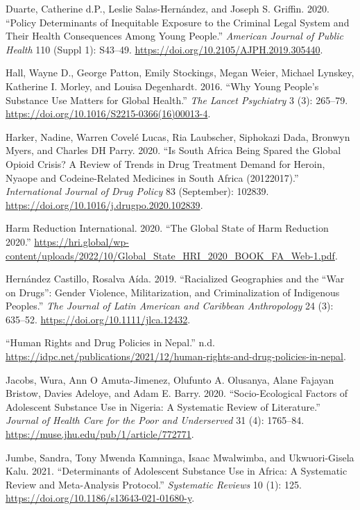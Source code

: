 \documentclass[
  letterpaper,
  DIV=11,
  numbers=noendperiod]{scrartcl}
\newlength{\cslhangindent}
\newenvironment{CSLReferences}[2] %
 {\begin{list}{}{%
  \setlength{\itemindent}{0pt}
  \setlength{\leftmargin}{0pt}
  \setlength{\parsep}{0pt}
  \ifodd #1
   \setlength{\leftmargin}{\cslhangindent}
   \setlength{\itemindent}{-1\cslhangindent}
  \fi
  \setlength{\itemsep}{#2\baselineskip}}}
 {\end{list}}
\begin{document}
\begin{CSLReferences}{1}{0}
Duarte, Catherine d.P., Leslie Salas-Hernández, and Joseph S. Griffin.
2020. {``Policy Determinants of Inequitable Exposure to the Criminal
Legal System and Their Health Consequences Among Young People.''}
\emph{American Journal of Public Health} 110 (Suppl 1): S43--49.
\url{https://doi.org/10.2105/AJPH.2019.305440}.

Hall, Wayne D., George Patton, Emily Stockings, Megan Weier, Michael
Lynskey, Katherine I. Morley, and Louisa Degenhardt. 2016. {``Why Young
People's Substance Use Matters for Global Health.''} \emph{The Lancet
Psychiatry} 3 (3): 265--79.
\url{https://doi.org/10.1016/S2215-0366(16)00013-4}.

Harker, Nadine, Warren Covelé Lucas, Ria Laubscher, Siphokazi Dada,
Bronwyn Myers, and Charles DH Parry. 2020. {``Is South Africa Being
Spared the Global Opioid Crisis? A Review of Trends in Drug Treatment
Demand for Heroin, Nyaope and Codeine-Related Medicines in South Africa
(2012{\textendash}2017).''} \emph{International Journal of Drug Policy}
83 (September): 102839.
\url{https://doi.org/10.1016/j.drugpo.2020.102839}.

Harm Reduction International. 2020. {``The Global State of Harm
Reduction 2020.''}
\url{https://hri.global/wp-content/uploads/2022/10/Global_State_HRI_2020_BOOK_FA_Web-1.pdf}.

Hernández Castillo, Rosalva Aída. 2019. {``Racialized Geographies and
the {``}War on Drugs{''}: Gender Violence, Militarization, and
Criminalization of Indigenous Peoples.''} \emph{The Journal of Latin
American and Caribbean Anthropology} 24 (3): 635--52.
\url{https://doi.org/10.1111/jlca.12432}.

{``Human Rights and Drug Policies in Nepal.''} n.d.
\url{https://idpc.net/publications/2021/12/human-rights-and-drug-policies-in-nepal}.

Jacobs, Wura, Ann O Amuta-Jimenez, Olufunto A. Olusanya, Alane Fajayan
Bristow, Davies Adeloye, and Adam E. Barry. 2020. {``Socio-Ecological
Factors of Adolescent Substance Use in Nigeria: A Systematic Review of
Literature.''} \emph{Journal of Health Care for the Poor and
Underserved} 31 (4): 1765--84.
\url{https://muse.jhu.edu/pub/1/article/772771}.

Jumbe, Sandra, Tony Mwenda Kamninga, Isaac Mwalwimba, and Ukwuori-Gisela
Kalu. 2021. {``Determinants of Adolescent Substance Use in Africa: A
Systematic Review and Meta-Analysis Protocol.''} \emph{Systematic
Reviews} 10 (1): 125. \url{https://doi.org/10.1186/s13643-021-01680-y}.


\end{CSLReferences}
\end{document}
